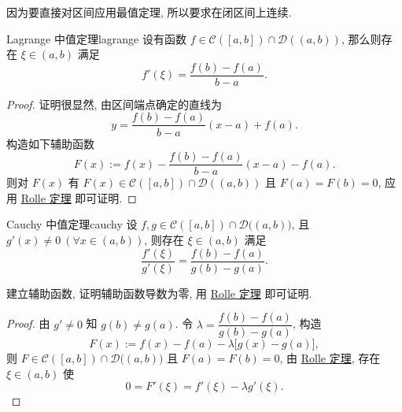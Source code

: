 \documentclass[cn,toc=twocol]{elegantbook}
\newcommand{\D}{\mathscr{D}}
\begin{document}
\begin{remark}
因为要直接对区间应用最值定理, 所以要求在闭区间上连续.	
\end{remark}

\vspace{0.5em}

\begin{theorem}{Lagrange 中值定理}{lagrange}
	设有函数 $f \in \mathscr{C}([a,b]) \cap \D((a,b))$, 那么则存在 $\xi \in (a,b)$ 满足 
	\[
		f'(\xi) = \frac{f(b) - f(a)}{b - a}.
	\]
\end{theorem}
\begin{proof}
	证明很显然, 由区间端点确定的直线为
	\[
		y = \frac{f(b) - f(a)}{b - a} (x - a) + f(a).
	\]
	构造如下辅助函数
	\[
		F(x) := f(x) - \frac{f(b) - f(a)}{b - a} (x - a) - f(a).
	\]
	则对 $F(x)$ 有 $F(x) \in \mathscr{C}([a,b]) \cap \D((a,b))$ 且 $F(a) = F(b) = 0$, 应用 \hyperref[thm:rolle]{Rolle 定理} 即可证明.
\end{proof}

\vspace{0.5em}

\begin{theorem}{Cauchy 中值定理}{cauchy}
	设 $f,g\in \mathscr{C}([a,b])\cap \D\bigl((a,b)\bigr)$, 且 $g'(x)\neq 0\ (\forall x\in(a,b))$,
则存在 $\xi\in(a,b)$ 满足
\[
\frac{f'(\xi)}{g'(\xi)}=\frac{f(b)-f(a)}{g(b)-g(a)}.
\]
\end{theorem}
\begin{idea*}
	建立辅助函数, 证明辅助函数导数为零, 用 \hyperref[thm:rolle]{Rolle 定理} 即可证明.
\end{idea*}
\begin{proof}
	由 $g'\neq0$ 知 $g(b)\neq g(a)$. 令
$\lambda=\dfrac{f(b)-f(a)}{g(b)-g(a)}$, 构造
\[
F(x):=f(x)-f(a)-\lambda\bigl[g(x)-g(a)\bigr],
\]
则 $F\in \mathscr{C}([a,b])\cap \D\bigl((a,b)\bigr)$ 且 $F(a)=F(b)=0$, 
由 \hyperref[thm:rolle]{Rolle 定理}, 存在 $\xi\in(a,b)$ 使
\[
0=F'(\xi)=f'(\xi)-\lambda g'(\xi).
\]
\end{proof}



\end{document}

